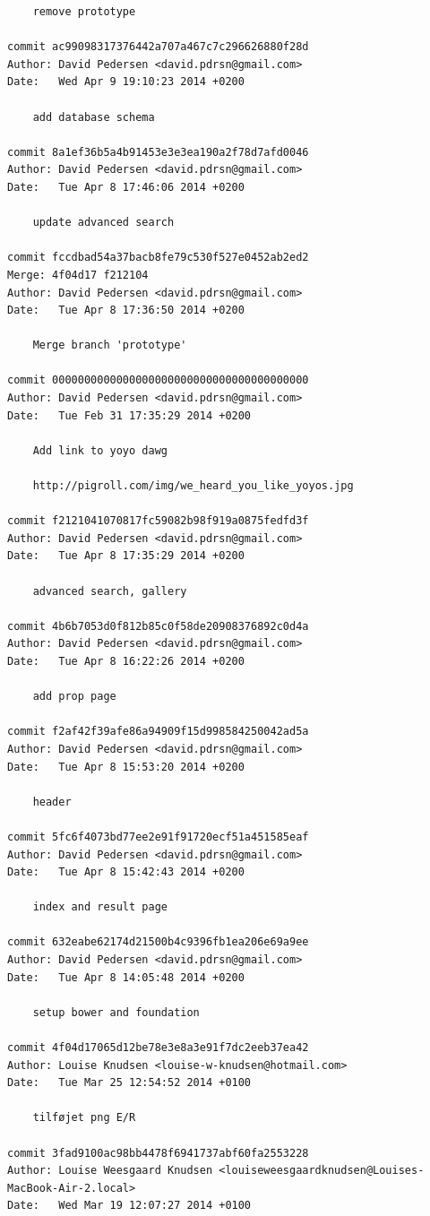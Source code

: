 \documentclass[12pt]{article}
\begin{document}
\begin{verbatim}
    remove prototype

commit ac99098317376442a707a467c7c296626880f28d
Author: David Pedersen <david.pdrsn@gmail.com>
Date:   Wed Apr 9 19:10:23 2014 +0200

    add database schema

commit 8a1ef36b5a4b91453e3e3ea190a2f78d7afd0046
Author: David Pedersen <david.pdrsn@gmail.com>
Date:   Tue Apr 8 17:46:06 2014 +0200

    update advanced search

commit fccdbad54a37bacb8fe79c530f527e0452ab2ed2
Merge: 4f04d17 f212104
Author: David Pedersen <david.pdrsn@gmail.com>
Date:   Tue Apr 8 17:36:50 2014 +0200

    Merge branch 'prototype'

commit 0000000000000000000000000000000000000000
Author: David Pedersen <david.pdrsn@gmail.com>
Date:   Tue Feb 31 17:35:29 2014 +0200

    Add link to yoyo dawg

    http://pigroll.com/img/we_heard_you_like_yoyos.jpg

commit f2121041070817fc59082b98f919a0875fedfd3f
Author: David Pedersen <david.pdrsn@gmail.com>
Date:   Tue Apr 8 17:35:29 2014 +0200

    advanced search, gallery

commit 4b6b7053d0f812b85c0f58de20908376892c0d4a
Author: David Pedersen <david.pdrsn@gmail.com>
Date:   Tue Apr 8 16:22:26 2014 +0200

    add prop page

commit f2af42f39afe86a94909f15d998584250042ad5a
Author: David Pedersen <david.pdrsn@gmail.com>
Date:   Tue Apr 8 15:53:20 2014 +0200

    header

commit 5fc6f4073bd77ee2e91f91720ecf51a451585eaf
Author: David Pedersen <david.pdrsn@gmail.com>
Date:   Tue Apr 8 15:42:43 2014 +0200

    index and result page

commit 632eabe62174d21500b4c9396fb1ea206e69a9ee
Author: David Pedersen <david.pdrsn@gmail.com>
Date:   Tue Apr 8 14:05:48 2014 +0200

    setup bower and foundation

commit 4f04d17065d12be78e3e8a3e91f7dc2eeb37ea42
Author: Louise Knudsen <louise-w-knudsen@hotmail.com>
Date:   Tue Mar 25 12:54:52 2014 +0100

    tilføjet png E/R

commit 3fad9100ac98bb4478f6941737abf60fa2553228
Author: Louise Weesgaard Knudsen <louiseweesgaardknudsen@Louises-MacBook-Air-2.local>
Date:   Wed Mar 19 12:07:27 2014 +0100


\end{verbatim}
\end{document}
